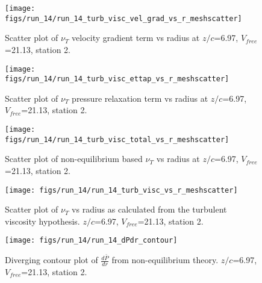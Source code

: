 \begin{figure}[H]
\centering
\texttt{[image: figs/run\_14/run\_14\_turb\_visc\_vel\_grad\_vs\_r\_meshscatter]}
\caption{Scatter plot of $\nu_T$ velocity gradient term vs radius at $z/c$=6.97, $V_{free}$=21.13, station 2.}
\end{figure}


\begin{figure}[H]
\centering
\texttt{[image: figs/run\_14/run\_14\_turb\_visc\_ettap\_vs\_r\_meshscatter]}
\caption{Scatter plot of $\nu_T$ pressure relaxation term vs radius at $z/c$=6.97, $V_{free}$=21.13, station 2.}
\end{figure}


\begin{figure}[H]
\centering
\texttt{[image: figs/run\_14/run\_14\_turb\_visc\_total\_vs\_r\_meshscatter]}
\caption{Scatter plot of non-equilibrium based $\nu_T$ vs radius at $z/c$=6.97, $V_{free}$=21.13, station 2.}
\end{figure}


\begin{figure}[H]
\centering
\texttt{[image: figs/run\_14/run\_14\_turb\_visc\_vs\_r\_meshscatter]}
\caption{Scatter plot of $\nu_T$ vs radius as calculated from the turbulent viscosity hypothesis. $z/c$=6.97, $V_{free}$=21.13, station 2.}
\end{figure}


\begin{figure}[H]
\centering
\texttt{[image: figs/run\_14/run\_14\_dPdr\_contour]}
\caption{Diverging contour plot of $\frac{d\bar{P}}{dr}$ from non-equilibrium theory. $z/c$=6.97, $V_{free}$=21.13, station 2.}
\end{figure}


